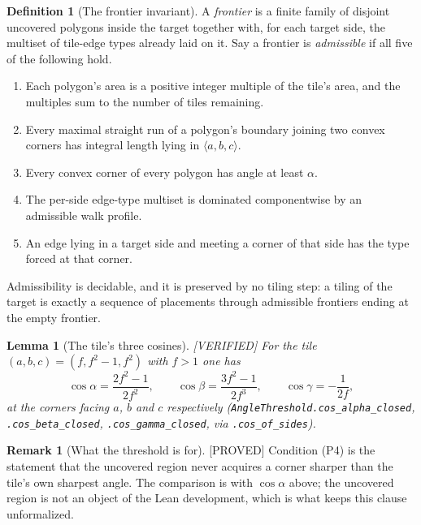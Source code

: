 \documentclass[11pt,reqno]{amsart}
\theoremstyle{plain}
\newtheorem{lemma}[theorem]{Lemma}
\theoremstyle{definition}
\newtheorem{remark}[theorem]{Remark}
\newtheorem{definition}[theorem]{Definition}
\newcommand{\lab}[1]{\hfill\textnormal{\footnotesize\textsc{[#1]}}}
\begin{document}
\begin{definition}[The frontier invariant]\label{def:frontier}
A \emph{frontier} is a finite family of disjoint uncovered polygons inside the target together
with, for each target side, the multiset of tile-edge types already laid on it. Say a frontier is
\emph{admissible} if all five of the following hold.
\begin{enumerate}
\item[(P1)] Each polygon's area is a positive integer multiple of the tile's area, and the
multiples sum to the number of tiles remaining.
\item[(P2)] Every maximal straight run of a polygon's boundary joining two convex corners has
integral length lying in $\langle a,b,c\rangle$.
\item[(P4)] Every convex corner of every polygon has angle at least $\alpha$.
\item[(P5)] The per-side edge-type multiset is dominated componentwise by an admissible walk
profile.
\item[(P6)] An edge lying in a target side and meeting a corner of that side has the type forced
at that corner.
\end{enumerate}
Admissibility is decidable, and it is preserved by no tiling step: a tiling of the target is
exactly a sequence of placements through admissible frontiers ending at the empty frontier.
\end{definition}

\begin{lemma}[The tile's three cosines]\label{lem:anglethreshold}\lab{VERIFIED}
For the tile $(a,b,c)=(f,f^2-1,f^2)$ with $f>1$ one has
\[
\cos\alpha=\frac{2f^2-1}{2f^2},\qquad
\cos\beta=\frac{3f^2-1}{2f^3},\qquad
\cos\gamma=-\frac{1}{2f},
\]
at the corners facing $a$, $b$ and $c$ respectively
(\texttt{AngleThreshold.cos\_alpha\_closed}, \texttt{.cos\_beta\_closed},
\texttt{.cos\_gamma\_closed}, via \texttt{.cos\_of\_sides}).
\end{lemma}

\begin{remark}[What the threshold is for]\label{rem:anglethreshold}\lab{PROVED}
Condition (P4) is the statement that the uncovered region never acquires a corner sharper than the
tile's own sharpest angle. The comparison is with $\cos\alpha$ above; the uncovered region is not an
object of the Lean development, which is what keeps this clause unformalized.
\end{remark}
\end{document}
